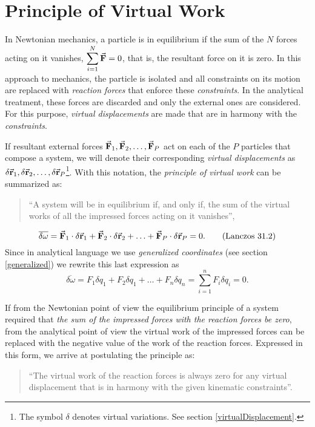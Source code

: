 \documentclass[12pt, english, a4paper]{article}
\begin{document}
\section{Principle of Virtual Work}\label{virtualWork} %
In Newtonian mechanics, a particle is in equilibrium if the sum of the \(N\) forces acting on it vanishes, \(\displaystyle\sum_{i=1}^N \va{F}= 0\), that is, the resultant force on it is zero.
In this approach to mechanics, the particle is isolated and all constraints on its motion are replaced with \emph{reaction forces} that enforce these \emph{constraints}.
In the analytical treatment, these forces are discarded and only the external ones are considered.
For this purpose, \emph{virtual displacements} are made that are in harmony with the \emph{constraints}.

If resultant external forces \(\va{F}_1, \va{F}_2, \ldots, \va{F}_P\) act on each of the \(P\) particles that compose a system, we will denote their corresponding \emph{virtual displacements} as \(\delta \va{r}_1, \delta \va{r}_2, \ldots, \delta \va{r}_P\)\footnote{The symbol \(\delta\) denotes virtual variations. See section \ref{virtualDisplacement}.}.
With this notation, the \emph{principle of virtual work} can be summarized as:
\begin{quote}
 ``A system will be in equilibrium if, and only if, the sum of the virtual works of all the impressed forces acting on it vanishes'',
\end{quote}
\begin{equation}\label{Lanczos31.2}
	\overline {\delta \omega} = 
	\va{F}_1 \cdot \delta \va{r}_1+ \va{F}_2 \cdot \delta \va{r}_2+ \ldots+ \va{F}_P \cdot \delta \va{r}_P = 0.
	\tag{Lanczos 31.2}
\end{equation}
Since in analytical language we use \emph{generalized coordinates} (see section \ref{generalized}) we rewrite this last expression as
\begin{equation}\label{Lanczos31.4}
	\overline {\delta \omega} = 
	F_1 \delta q_1+ F_2 \delta q_1+ \ldots + F_n \delta q_n = \sum_{i=1}^n F_i \delta q_i = 0. 
	\tag{Lanczos 31.4}
\end{equation}

If from the Newtonian point of view the equilibrium principle of a system required that \emph{the sum of the impressed forces with the reaction forces be zero}, from the analytical point of view the virtual work of the impressed forces can be replaced with the negative value of the work of the reaction forces.
Expressed in this form, we arrive at postulating the principle as:
\begin{quote} 
``The virtual work of the reaction forces is always zero for any virtual displacement that is in harmony with the given kinematic constraints''.
\end{quote} 
\end{document}
